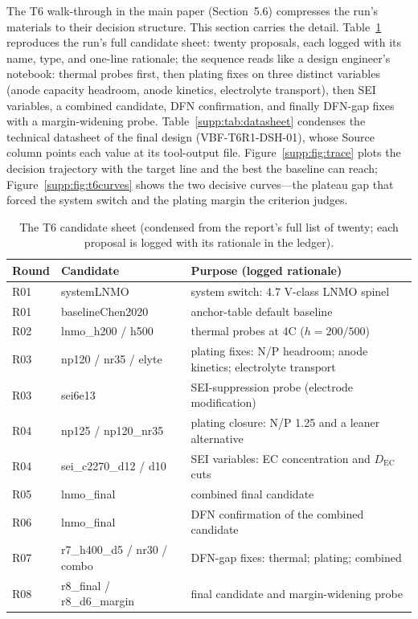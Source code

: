 \documentclass[review,11pt]{elsarticle}
\begin{document}
The T6 walk-through in the main paper (Section~5.6) compresses the run's
materials to their decision structure. This section carries the detail.
Table~\ref{supp:tab:candidates} reproduces the run's full candidate
sheet: twenty proposals, each logged with its name, type, and one-line
rationale; the sequence reads like a design engineer's notebook: thermal
probes first, then plating fixes on three distinct variables (anode capacity
headroom, anode kinetics, electrolyte transport), then SEI variables, a
combined candidate, DFN confirmation, and finally DFN-gap fixes with a
margin-widening probe. Table~\ref{supp:tab:datasheet} condenses the
technical datasheet of the final design (VBF-T6R1-DSH-01), whose Source
column points each value at its tool-output file.
Figure~\ref{supp:fig:trace} plots the decision trajectory with the target
line and the best the baseline can reach; Figure~\ref{supp:fig:t6curves} shows the two
decisive curves---the plateau gap that forced the system switch and the
plating margin the criterion judges.

\begin{table}[!ht]
\centering
\caption{The T6 candidate sheet (condensed from the report's full list of
twenty; each proposal is logged with its rationale in the ledger).}
\label{supp:tab:candidates}
\setlength{\tabcolsep}{2.5pt}
\begin{tabular}{p{1.1cm}p{3.0cm}p{7.4cm}}
\toprule
Round & Candidate & Purpose (logged rationale) \\
\midrule
R01 & systemLNMO & system switch: 4.7 V-class LNMO spinel \\
R01 & baselineChen2020 & anchor-table default baseline \\
R02 & lnmo\_h200 / h500 & thermal probes at 4C ($h=200/500$) \\
R03 & np120 / nr35 / elyte & plating fixes: N/P headroom; anode kinetics; electrolyte transport \\
R03 & sei6e13 & SEI-suppression probe (electrode modification) \\
R04 & np125 / np120\_nr35 & plating closure: N/P 1.25 and a leaner alternative \\
R04 & sei\_c2270\_d12 / d10 & SEI variables: EC concentration and $D_{\mathrm{EC}}$ cuts \\
R05 & lnmo\_final & combined final candidate \\
R06 & lnmo\_final & DFN confirmation of the combined candidate \\
R07 & r7\_h400\_d5 / nr30 / combo & DFN-gap fixes: thermal; plating; combined \\
R08 & r8\_final / r8\_d6\_margin & final candidate and margin-widening probe \\
\bottomrule
\end{tabular}
\end{table}
\end{document}
